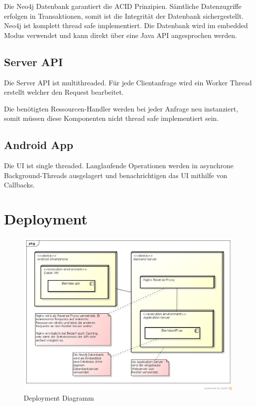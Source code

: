 \documentclass[10pt,a4paper]{scrartcl}
\begin{document}
Die Neo4j Datenbank garantiert die ACID Prinzipien.
Sämtliche Datenzugriffe erfolgen in Transaktionen, somit ist die Integrität der Datenbank
sichergestellt.
Neo4j ist komplett thread safe implementiert.  Die Datenbank wird im
embedded Modus verwendet und kann direkt über eine Java API angesprochen werden.

\subsection{Server API}

Die Server API ist multithreaded. Für jede Clientanfrage wird ein Worker Thread erstellt welcher den
Request bearbeitet.

Die benötigten Ressourcen-Handler werden bei jeder Anfrage neu instanziert, somit müssen diese
Komponenten nicht thread safe implementiert sein.

\subsection{Android App}

Die UI ist single threaded. Langlaufende Operationen werden in asynchrone Background-Threads ausgelagert und
benachrichtigen das UI mithilfe von Callbacks.


\section{Deployment}

\begin{figure}[H]
	\includegraphics[width=\textwidth]{DeploymentDiagram.png}
	\caption{Deployment Diagramm}
	\label{fig:deployment_diagram}
\end{figure}
\end{document}
